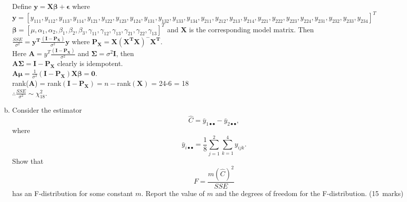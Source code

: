 \documentclass[soln,12pt]{utarexam}
\begin{document}
\begin{enumerate}
\begin{enumerate}[(a)]
\begin{answer}
           Define $\mathbf{y} = \mathbf{X}\bm{\beta}+\bm{\epsilon}$ where\\
           $\mathbf{y} = [y_{111}, y_{112}, y_{113}, y_{114}, y_{121}, y_{122}, y_{123},y_{124}, y_{131}, y_{132}, y_{133},y_{134},  y_{211}, y_{212}, y_{213},y_{214}, y_{221}, y_{222}, y_{223}, y_{224}, y_{231}, y_{232}, y_{233}, y_{234}]^T$\\
           $\bm{\beta} = [\mu, \alpha_1, \alpha_2, \beta_1, \beta_2, \beta_3, \gamma_{11}, \gamma_{12},\gamma_{13},  \gamma_{21}, \gamma_{22}, \gamma_{13}]^T$ and $\mathbf{X}$ is the corresponding model matrix. Then\\
$\frac{SSE}{\sigma^2} = \mathbf{y^T}\frac{(\mathbf{I-P_X})}{\sigma^2}\mathbf{y}$ where $\mathbf{P_X} = \mathbf{X}(\mathbf{X^T}\mathbf{X})^{-}\mathbf{X^T}$.\\
Here $\mathbf{A} = {y^T}\frac{(\mathbf{I-P_X})}{\sigma^2}$ and $\bm{\Sigma} = \sigma^2\mathbf{I}$, then\\
$\mathbf{A}\bm{\Sigma} = \mathbf{I-P_X}$ clearly is idempotent.\\
$\mathbf{A}\bm{\mu} = \frac{1}{\sigma^2}(\mathbf{I-P_X})\mathbf{X}\bm{\beta} = \mathbf{0}$.\\
rank($\mathbf{A}$) = rank$(\mathbf{I-P_X}) = n -$rank$(\mathbf{X})$ = 24-6 = 18\\
$\therefore \frac{SSE}{\sigma^2} \sim \chi_{18}^2$.           
         \end{answer}


       \item Consider the estimator $$\hat C = \bar y_{1 \bullet  \bullet} -
         \bar y_{2 \bullet  \bullet},$$ where
         $$\bar y_{i \bullet  \bullet} = \frac18 \sum_{j=1}^2 \sum_{k=1}^4
         y_{ijk}.$$ 
         Show that $$F = \frac{m(\hat C)^2}{SSE}$$ has an
         F-distribution for some constant $m$. Report the value of $m$
         and the degrees of freedom for the F-distribution. \hfill(15~marks)
         \begin{answer}~


\end{answer}
\end{enumerate}
\end{enumerate}
\end{document}
